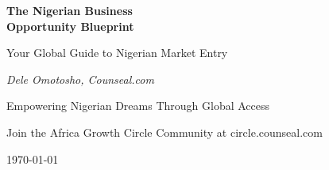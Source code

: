 \documentclass[11pt,letterpaper,openany]{book}
\newcommand{\currentdate}{\today}
\begin{document}
    \frontmatter

    \begin{titlepage}
        \centering
        \vspace*{2cm}
        {\Huge\bfseries\color{primarydark} The Nigerian Business\\Opportunity Blueprint\par}
        \vspace{1cm}
        {\Large\color{primary} Your Global Guide to Nigerian Market Entry\par}
        \vspace{2cm}
        {\Large\itshape Dele Omotosho, Counseal.com\par}
        \vspace{1cm}
        {\large Empowering Nigerian Dreams Through Global Access\par}
        \vfill
        {\large Join the Africa Growth Circle Community at circle.counseal.com\par}
        \vspace{1cm}
        {\large \currentdate\par}
    \end{titlepage}

    \tableofcontents

    \mainmatter

    
    
    
%    
%    
%    
%    
%    
%    
%    
%    

    \backmatter

%    
%    
%    
%    
%    
\end{document}
